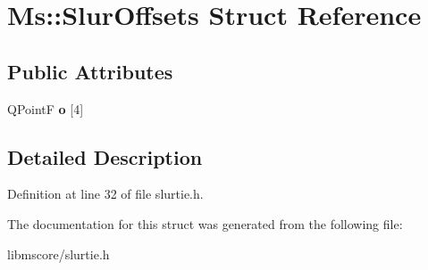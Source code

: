 \hypertarget{struct_ms_1_1_slur_offsets}{}\section{Ms\+:\+:Slur\+Offsets Struct Reference}
\label{struct_ms_1_1_slur_offsets}
\subsection*{Public Attributes}
\begin{DoxyCompactItemize}
\item 
\mbox{\label{struct_ms_1_1_slur_offsets_a40e4017df20ee45631396cc8655ebbe2}} 
Q\+PointF {\bfseries o} \mbox{[}4\mbox{]}
\end{DoxyCompactItemize}


\subsection{Detailed Description}


Definition at line 32 of file slurtie.\+h.



The documentation for this struct was generated from the following file\+:\begin{DoxyCompactItemize}
\item 
libmscore/slurtie.\+h\end{DoxyCompactItemize}
